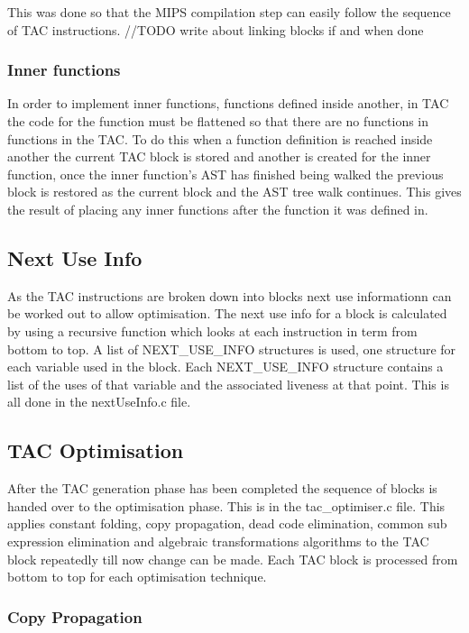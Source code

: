 \documentclass{article}
\begin{document}
This was done so that the MIPS compilation step can easily follow the sequence of
TAC instructions. //TODO write about linking blocks if and when done

\subsubsection{Inner functions}

In order to implement inner functions, functions defined inside another, in TAC
the code for the function must be flattened so that there are no functions in functions
in the TAC. To do this when a function definition is reached inside another the current
TAC block is stored and another is created for the inner function, once the inner function's
AST has finished being walked the previous block is restored as the current block and
the AST tree walk continues. This gives the result of placing any inner functions after
the function it was defined in.

\subsection{Next Use Info}

As the TAC instructions are broken down into blocks next use informationn can be
worked out to allow optimisation. The next use info for a block is calculated by
using a recursive function which looks at each instruction in term from bottom
to top. A list of NEXT\_USE\_INFO structures is used, one structure for each variable
used in the block. Each NEXT\_USE\_INFO structure contains a list of the uses of that
variable and the associated liveness at that point. This is all done in the nextUseInfo.c file.

\subsection{TAC Optimisation}

After the TAC generation phase has been completed the sequence of blocks is handed
over to the optimisation phase. This is in the tac\_optimiser.c file. This applies
constant folding, copy propagation, dead code elimination, common sub expression
elimination and algebraic transformations algorithms to the TAC block repeatedly till
now change can be made. Each TAC block is processed from bottom to top for each
optimisation technique.

\subsubsection{Copy Propagation}
\end{document}
